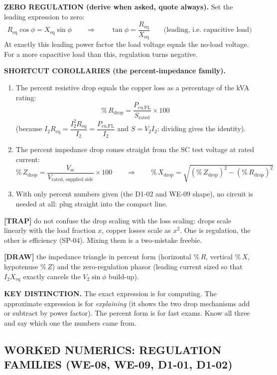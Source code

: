 \documentclass[11pt]{article}
\newcommand{\tagline}[1]{\textbf{\color{copper}#1}}
\newcommand{\keydist}[1]{\vspace{2pt}\textbf{\color{red}KEY DISTINCTION.} #1}
\newcommand{\drawline}[1]{\textbf{\color{muted}[DRAW]} #1}
\newcommand{\trap}[1]{\vspace{2pt}\textbf{\color{red}[TRAP]} #1}
\begin{document}
\tagline{ZERO REGULATION (derive when asked, quote always).} Set the leading expression to zero:
\[
R_{\text{eq}}\cos\phi = X_{\text{eq}}\sin\phi
\qquad\Longrightarrow\qquad
\tan\phi = \frac{R_{\text{eq}}}{X_{\text{eq}}}
\qquad\text{(leading, i.e. capacitive load)}
\]
At exactly this leading power factor the load voltage equals the no-load voltage. For a more capacitive load than this, regulation turns negative.

\tagline{SHORTCUT COROLLARIES (the percent-impedance family).}
\begin{enumerate}[label=\arabic*.]
\item The percent resistive drop equals the copper loss as a percentage of the kVA rating:
\[
\%\,R_{\text{drop}} = \frac{P_{\text{cu,FL}}}{S_{\text{rated}}} \times 100
\]
(because $I_2 R_{\text{eq}} = \dfrac{I_2^{2} R_{\text{eq}}}{I_2} = \dfrac{P_{\text{cu,FL}}}{I_2}$ and $S = V_2 I_2$: dividing gives the identity).
\item The percent impedance drop comes straight from the SC test voltage at rated current:
\[
\%\,Z_{\text{drop}} = \frac{V_{\text{sc}}}{V_{\text{rated, supplied side}}} \times 100
\qquad\Longrightarrow\qquad
\%\,X_{\text{drop}} = \sqrt{\left(\%\,Z_{\text{drop}}\right)^{2} - \left(\%\,R_{\text{drop}}\right)^{2}}
\]
\item With only percent numbers given (the D1-02 and WE-09 shape), no circuit is needed at all: plug straight into the compact line.
\end{enumerate}

\trap{do not confuse the drop scaling with the loss scaling: drops scale linearly with the load fraction $x$, copper losses scale as $x^{2}$. One is regulation, the other is efficiency (SP-04). Mixing them is a two-mistake freebie.}

\drawline{the impedance triangle in percent form (horizontal $\%\,R$, vertical $\%\,X$, hypotenuse $\%\,Z$) and the zero-regulation phasor (leading current sized so that $I_2 X_{\text{eq}}$ exactly cancels the $V_2\sin\phi$ build-up).}

\keydist{The exact expression is for computing. The approximate expression is for \emph{explaining} (it shows the two drop mechanisms add or subtract by power factor). The percent form is for fast exams. Know all three and say which one the numbers came from.}

\hrulefill
\subsection*{\color{copper}WORKED NUMERICS: REGULATION FAMILIES (WE-08, WE-09, D1-01, D1-02)}
\end{document}
